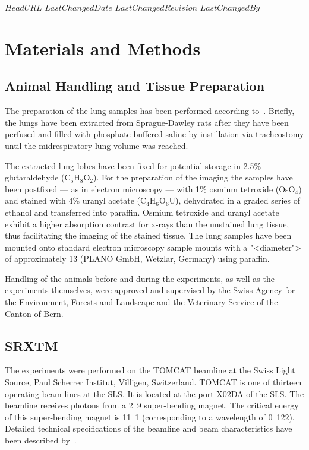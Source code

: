 \svnidlong
{$HeadURL$}
{$LastChangedDate$}
{$LastChangedRevision$}
{$LastChangedBy$}
\section{Materials and Methods}
\label{sec:materials and methods}
\subsection{Animal Handling and Tissue Preparation}
The preparation of the lung samples has been performed according to~\citet{Schittny1997,Schittny1998}. Briefly, the lungs have been extracted from Sprague-Dawley rats after they have been perfused and filled with phosphate buffered saline by instillation via tracheostomy until the midrespiratory lung volume was reached.

The extracted lung lobes have been fixed for potential storage in 2.5\% glutaraldehyde (C$_5$H$_8$O$_2$). For the preparation of the imaging the samples have been postfixed --- as in electron microscopy --- with 1\% osmium tetroxide (OsO$_4$) and stained with 4\% uranyl acetate (C$_4$H$_6$O$_6$U), dehydrated in a graded series of ethanol and transferred into paraffin. Osmium tetroxide and uranyl acetate exhibit a higher absorption contrast for x-rays than the unstained lung tissue, thus facilitating the imaging of the stained tissue. The lung samples have been mounted onto standard electron microscopy sample mounts with a "<diameter"> of approximately \unit{13}{\milli\meter} (PLANO GmbH, Wetzlar, Germany) using paraffin.

Handling of the animals before and during the experiments, as well as the experiments themselves, were approved and supervised by the Swiss Agency for the Environment, Forests and Landscape and the Veterinary Service of the Canton of Bern.

\subsection{SRXTM}
The experiments were performed on the TOMCAT beamline at the Swiss Light Source, Paul Scherrer Institut, Villigen, Switzerland. TOMCAT is one of thirteen operating beam lines at the SLS. It is located at the port X02DA of the SLS. The beamline receives photons from a \unit{2.9}{\tesla} super-bending magnet. The critical energy of this super-bending magnet is \unit{11.1}{\kilo\electronvolt} (corresponding to a wavelength of \unit{0.122}{\nano\meter}). Detailed technical specifications of the beamline and beam characteristics have been described by~\citet{Stampanoni2006a,Stampanoni2007}.

